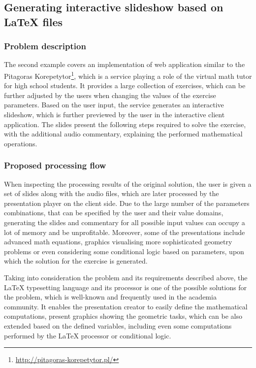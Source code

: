 \subsection{Generating interactive slideshow based on LaTeX files} \label{chapter:examples-generating-interactive-slideshow-based-on-latex-files}

\subsubsection{Problem description}

The second example covers an implementation of web application similar to the Pitagoras Korepetytor\footnote{\url{http://pitagoras-korepetytor.pl/}}, which is a service playing a role of the virtual math tutor for high school students.
It provides a large collection of exercises, which can be further adjusted by the users when changing the values of the exercise parameters.
Based on the user input, the service generates an interactive slideshow, which is further previewed by the user in the interactive client application.
The slides present the following steps required to solve the exercise, with the additional audio commentary, explaining the performed mathematical operations.

\subsubsection{Proposed processing flow} \label{chapter:examples-generating-interactive-slideshow-based-on-latex-files-proposed-processing-flow}

When inspecting the processing results of the original solution, the user is given a set of slides along with the audio files, which are later processed by the presentation player on the client side.
Due to the large number of the parameters combinations, that can be specified by the user and their value domains, generating the slides and commentary for all possible input values can occupy a lot of memory and be unprofitable.
Moreover, some of the presentations include advanced math equations, graphics visualising more sophisticated geometry problems or even considering some conditional logic based on parameters, upon which the solution for the exercise is generated.

Taking into consideration the problem and its requirements described above, the LaTeX \cite{latex} typesetting language and its processor is one of the possible solutions for the problem, which is well-known and frequently used in the academia community.
It enables the presentation creator to easily define the mathematical computations, present graphics showing the geometric tasks, which can be also extended based on the defined variables, including even some computations performed by the LaTeX processor or conditional logic.

